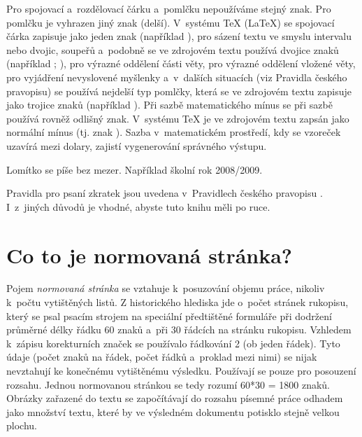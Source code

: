 Pro spojovací a~rozdělovací čárku a~pomlčku nepoužíváme stejný znak. Pro pomlčku je vyhrazen jiný znak (delší). V~systému TeX (LaTeX) se spojovací čárka zapisuje jako jeden znak  (například ), pro sázení textu ve smyslu intervalu nebo dvojic, soupeřů a~podobně se ve zdrojovém textu používá dvojice znaků  (například ; ), pro výrazné oddělení části věty, pro výrazné oddělení vložené věty, pro vyjádření nevyslovené myšlenky a~v~dalších situacích (viz Pravidla českého pravopisu) se používá nejdelší typ pomlčky, která se ve zdrojovém textu zapisuje jako trojice znaků  (například ). Při sazbě matematického mínus se při sazbě používá rovněž odlišný znak. V~systému TeX je ve zdrojovém textu zapsán jako normální mínus (tj. znak ). Sazba v~matematickém prostředí, kdy se vzoreček uzavírá mezi dolary, zajistí vygenerování správného výstupu.

Lomítko se píše bez mezer. Například školní rok 2008/2009.

Pravidla pro psaní zkratek jsou uvedena v~Pravidlech českého pravopisu \cite{Pravidla}. I~z~jiných důvodů je vhodné, abyste tuto knihu měli po ruce. 


\section{Co to je normovaná stránka?}
Pojem {\it normovaná stránka} se vztahuje k~posuzování objemu práce, nikoliv k~počtu vytištěných listů. Z historického hlediska jde o~počet stránek rukopisu, který se psal psacím strojem na speciální předtištěné formuláře při dodržení průměrné délky řádku 60 znaků a~při 30 řádcích na stránku rukopisu. Vzhledem k~zápisu korekturních značek se používalo řádkování 2 (ob jeden řádek). Tyto údaje (počet znaků na řádek, počet řádků a~proklad mezi nimi) se nijak nevztahují ke konečnému vytištěnému výsledku. Používají se pouze pro posouzení rozsahu. Jednou normovanou stránkou se tedy rozumí 60*30 = 1800 znaků. Obrázky zařazené do textu se započítávají do rozsahu písemné práce odhadem jako množství textu, které by ve výsledném dokumentu potisklo stejně velkou plochu.

